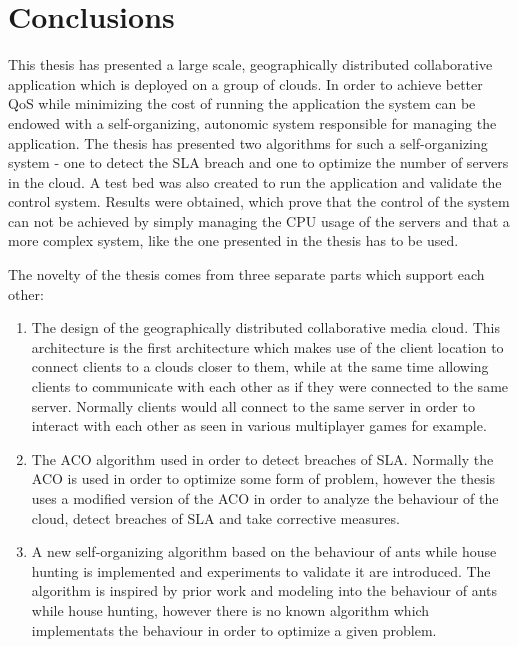\chapter{Conclusions} %
\label{Chapter6}

This thesis has presented a large scale, geographically distributed collaborative application which is deployed on a group of clouds. In order to achieve better QoS while minimizing the cost of running the application the system can be endowed with a self-organizing, autonomic system responsible for managing the application. The thesis has presented two algorithms for such a self-organizing system - one to detect the SLA breach and one to optimize the number of servers in the cloud. A test bed was also created to run the application and validate the control system. Results were obtained, which prove that the control of the system can not be achieved by simply managing the CPU usage of the servers and that a more complex system, like the one presented in the thesis has to be used.

The novelty of the thesis comes from three separate parts which support each other:

\begin{enumerate}
	\item The design of the geographically distributed collaborative media cloud. This architecture is the first architecture which makes use of the client location to connect clients to a clouds closer to them, while at the same time allowing clients to communicate with each other as if they were connected to the same server. Normally clients would all connect to the same server in order to interact with each other as seen in various multiplayer games for example.
	\item The ACO algorithm used in order to detect breaches of SLA. Normally the ACO is used in order to optimize some form of problem, however the thesis uses a modified version of the ACO in order to analyze the behaviour of the cloud, detect breaches of SLA and take corrective measures.
	\item A new self-organizing algorithm based on the behaviour of ants while house hunting is implemented and experiments to validate it are introduced. The algorithm is inspired by prior work and modeling into the behaviour of ants while house hunting, however there is no known algorithm which implementats the behaviour in order to optimize a given problem.
\end{enumerate}

